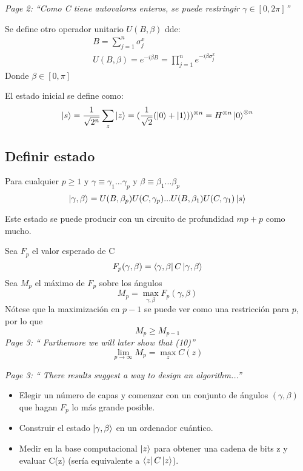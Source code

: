 \documentclass{article}
\begin{document}
\textit{Page 2: ``Como C tiene autovalores enteros, se puede restringir $\gamma \in [0, 2\pi]$''}

Se define otro operador unitario $U(B, \beta)$ dde:
\begin{align*}
  &B = \sum_{j = 1}^n \sigma_j^x &&\\
  &U(B, \beta) = e^{-i \beta B} = \prod_{j=1}^n e^{-i \beta \sigma_j^x}
\end{align*}
Donde $\beta \in [0, \pi]$

El estado inicial se define como:
\[
  \ket{s} = \frac{1}{\sqrt{2^n}} \sum_z\ket{z}
  = (\frac{1}{\sqrt{2}} (\ket{0} + \ket{1}))^{\otimes n}
  = H^{\otimes n} \ket{0}^{\otimes n}
\]

\subsection{Definir estado}
Para cualquier $p \geq 1$ y $\gamma \equiv \gamma_1 ... \gamma_p$ y $\beta \equiv \beta_1 ... \beta_p$
\[
  \ket{\gamma, \beta} = U(B, \beta_p)U(C, \gamma_p) ... U(B, \beta_1)U(C, \gamma_1)\ket{s}
\]

Este estado se puede producir con un circuito de profundidad $mp + p$ como mucho.

Sea $F_p$ el valor esperado de C
\[ F_p(\gamma, \beta) = \bra{\gamma, \beta}C\ket{\gamma, \beta} \]
Sea $M_p$ el máximo de $F_p$ sobre los ángulos
\[ M_p = \max_{\gamma, \beta} F_p(\gamma, \beta) \]
Nótese que la maximización en $p-1$ se puede ver como una restricción para $p$, por lo que
\[ M_p \geq M_{p-1} \]
\textit{Page 3: `` Furthemore we will later show that (10)''}
\[ \lim_{p \rightarrow \infty} M_p = \max_z C(z) \]

\textit{Page 3: `` There results suggest a way to design an algorithm...''}
\begin{itemize}
\item Elegir un número de capas y comenzar con un conjunto de ángulos $(\gamma, \beta)$ que hagan $F_p$ lo más grande posible.
  
\item Construir el estado $\ket{\gamma, \beta}$ en un ordenador cuántico.
  
\item Medir en la base computacional $\ket{z}$ para obtener una cadena de bits z y evaluar C(z) (sería equivalente a $\bra{z}C\ket{z}$).
  
\end{itemize}
\end{document}
